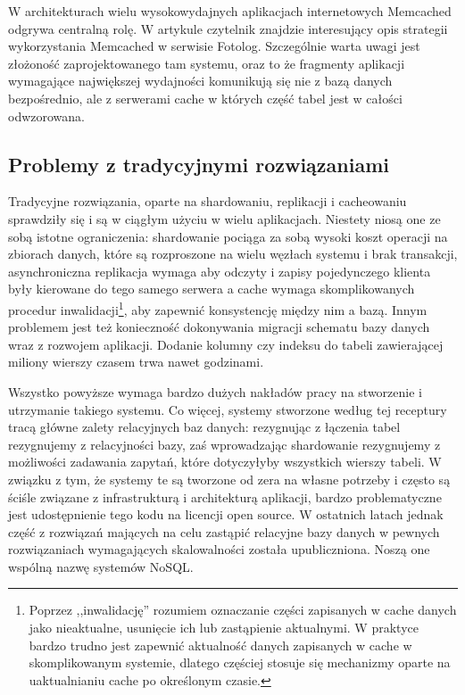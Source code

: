 W architekturach wielu wysokowydajnych aplikacjach internetowych Memcached odgrywa centralną rolę.
W artykule \cite{highscalability-mysql-memcached} czytelnik znajdzie interesujący opis strategii wykorzystania Memcached w serwisie Fotolog.
Szczególnie warta uwagi jest złożoność zaprojektowanego tam systemu, oraz to że fragmenty aplikacji wymagające największej wydajności komunikują się nie z bazą danych bezpośrednio, ale z serwerami cache w których część tabel jest w całości odwzorowana.

\subsection{Problemy z tradycyjnymi rozwiązaniami}

Tradycyjne rozwiązania, oparte na shardowaniu, replikacji i cacheowaniu sprawdziły się i są w ciągłym użyciu w wielu aplikacjach.
Niestety niosą one ze sobą istotne ograniczenia: shardowanie pociąga za sobą wysoki koszt operacji na zbiorach danych, które są rozproszone na wielu węzłach systemu i brak transakcji, asynchroniczna replikacja wymaga aby odczyty i zapisy pojedynczego klienta były kierowane do tego samego serwera a cache wymaga skomplikowanych procedur inwalidacji\footnote{Poprzez ,,inwalidację'' rozumiem oznaczanie części zapisanych w cache danych jako nieaktualne, usunięcie ich lub zastąpienie aktualnymi. W praktyce bardzo trudno jest zapewnić aktualność danych zapisanych w cache w skomplikowanym systemie, dlatego częściej stosuje się mechanizmy oparte na uaktualnianiu cache po określonym czasie.}, aby zapewnić konsystencję między nim a bazą.
Innym problemem jest też konieczność dokonywania migracji schematu bazy danych wraz z rozwojem aplikacji.
Dodanie kolumny czy indeksu do tabeli zawierającej miliony wierszy czasem trwa nawet godzinami.

Wszystko powyższe wymaga bardzo dużych nakładów pracy na stworzenie i utrzymanie takiego systemu.
Co więcej, systemy stworzone według tej receptury tracą główne zalety relacyjnych baz danych: rezygnując z łączenia tabel rezygnujemy z relacyjności bazy, zaś wprowadzając shardowanie rezygnujemy z możliwości zadawania zapytań, które dotyczyłyby wszystkich wierszy tabeli.
W związku z tym, że systemy te są tworzone od zera na własne potrzeby i często są ściśle związane z infrastrukturą i architekturą aplikacji, bardzo problematyczne jest udostępnienie tego kodu na licencji open source.
W ostatnich latach jednak część z rozwiązań mających na celu zastąpić relacyjne bazy danych w pewnych rozwiązaniach wymagających skalowalności została upubliczniona.
Noszą one wspólną nazwę systemów NoSQL.

